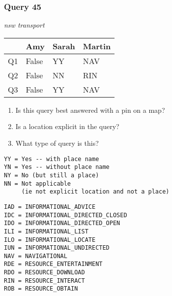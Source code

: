 \begin{frame}[fragile]
\frametitle{Query 45}
\vspace{1em}

\emph{nsw transport}

\vfill

\begin{table}
  \centering
  \begin{tabular}{ l l l l }
    & \textbf{Amy} & \textbf{Sarah} & \textbf{Martin}\\
    \toprule
    Q1 & False & YY & NAV\\
Q2 & False & NN & RIN\\
Q3 & False & YY & NAV\\
    \bottomrule
  \end{tabular}
\end{table}

\vfill

\tiny{

\begin{enumerate}
\item Is this query best answered with a pin on a map?
\item Is a location explicit in the query?
\item What type of query is this?
\end{enumerate}

\vfill

\begin{multicols}{2}
\begin{verbatim}
YY = Yes -- with place name
YN = Yes -- without place name
NY = No (but still a place)
NN = Not applicable 
     (ie not explicit location and not a place)
\end{verbatim}

\columnbreak
\begin{verbatim}
IAD = INFORMATIONAL_ADVICE
IDC = INFORMATIONAL_DIRECTED_CLOSED
IDO = INFORMATIONAL_DIRECTED_OPEN
ILI = INFORMATIONAL_LIST
ILO = INFORMATIONAL_LOCATE
IUN = INFORMATIONAL_UNDIRECTED
NAV = NAVIGATIONAL
RDE = RESOURCE_ENTERTAINMENT
RDO = RESOURCE_DOWNLOAD
RIN = RESOURCE_INTERACT
ROB = RESOURCE_OBTAIN
\end{verbatim}
\end{multicols}
}

\end{frame}



